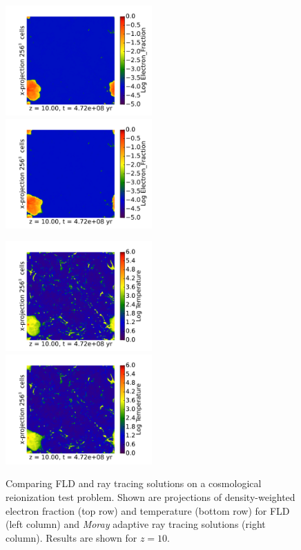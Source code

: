 \begin{figure}[t]
\centerline{\hfill 
  \includegraphics[width=0.5\textwidth]{proj_Electron_Fraction_wDensity_x_RD0001.pdf}
  \includegraphics[width=0.5\textwidth]{proj_Electron_Fraction_wDensity_x_RedshiftOutput0003.pdf}
  \hfill}
  \centerline{\hfill
  \includegraphics[width=0.5\textwidth]{proj_Temperature_wDensity_x_RD0001.pdf}
  \includegraphics[width=0.5\textwidth]{proj_Temperature_wDensity_x_RedshiftOutput0003.pdf}
  \hfill}
  \caption{Comparing FLD and ray tracing solutions on a cosmological reionization test problem. Shown are projections of density-weighted electron fraction (top row) and temperature (bottom row) for FLD (left column) and {\em Moray} adaptive ray tracing solutions (right column). Results are shown for $z=10$.}
  \label{fig:FLD_Moray_z10}
\end{figure}

